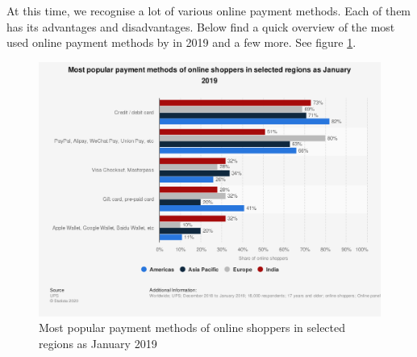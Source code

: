 \documentclass[thesis=M,english]{FITthesis}[2019/12/23]
\begin{document}
At this time, we recognise a lot of various online payment methods. Each of them has its advantages and disadvantages. Below find a quick overview of the most used online payment methods by \cite{statistaPaymentMethods} in 2019 and a few more. See figure \ref{fig:StatistaPaymnentsMethods}.

\begin{figure}[ht!]
    \centering
    \includegraphics[width=\textwidth]{assets/statistic_id676385_preferred-online-retail-payment-methods-worldwide-2019-by-region.png}
    \caption{Most popular payment methods of online shoppers in selected regions as January 2019}
    \label{fig:StatistaPaymnentsMethods}
\end{figure}
\end{document}
